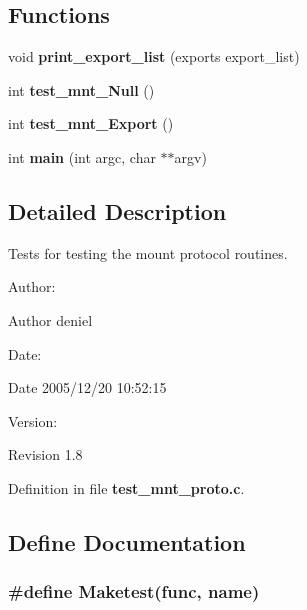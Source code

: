 \subsection*{Functions}
\begin{CompactItemize}
\item 
void {\bf print\_\-export\_\-list} (exports export\_\-list)
\item 
int {\bf test\_\-mnt\_\-Null} ()
\item 
int {\bf test\_\-mnt\_\-Export} ()
\item 
int {\bf main} (int argc, char $\ast$$\ast$argv)
\end{CompactItemize}


\subsection{Detailed Description}
Tests for testing the mount protocol routines. 

\begin{Desc}
\item[Author:]\end{Desc}
\begin{Desc}
\item[Author]deniel \end{Desc}
\begin{Desc}
\item[Date:]\end{Desc}
\begin{Desc}
\item[Date]2005/12/20 10:52:15 \end{Desc}
\begin{Desc}
\item[Version:]\end{Desc}
\begin{Desc}
\item[Revision]1.8 \end{Desc}


Definition in file {\bf test\_\-mnt\_\-proto.c}.

\subsection{Define Documentation}
\subsubsection[{Maketest}]{\setlength{\rightskip}{0pt plus 5cm}\#define Maketest(func, \/  name)}\label{test__mnt__proto_8c_0817aa0f6027fc10bd0562dc8a7cf1e2}


